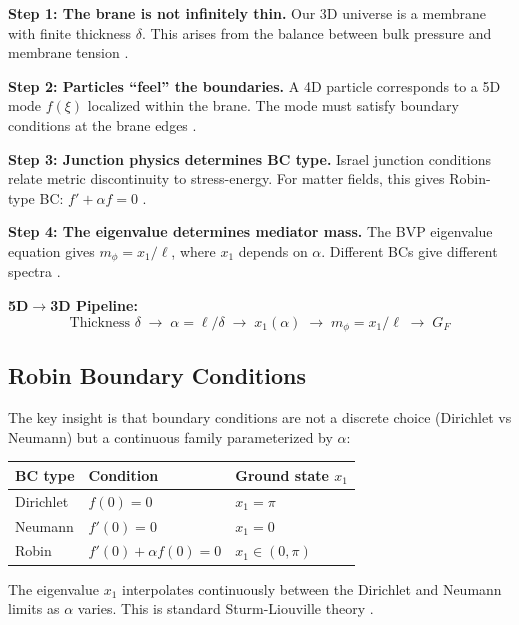 \begin{tcolorbox}[colback=green!5!white, colframe=green!50!black,
    title=\textbf{Physical Process: Membrane Thickness to Weak Scale}]

\textbf{Step 1: The brane is not infinitely thin.}
Our 3D universe is a membrane with finite thickness $\delta$. This arises from
the balance between bulk pressure and membrane tension \tagP{}.

\textbf{Step 2: Particles ``feel'' the boundaries.}
A 4D particle corresponds to a 5D mode $f(\xi)$ localized within the brane. The
mode must satisfy boundary conditions at the brane edges \tagDc{}.

\textbf{Step 3: Junction physics determines BC type.}
Israel junction conditions relate metric discontinuity to stress-energy. For
matter fields, this gives Robin-type BC: $f' + \alpha f = 0$ \tagDc{}.

\textbf{Step 4: The eigenvalue determines mediator mass.}
The BVP eigenvalue equation gives $m_\phi = x_1/\ell$, where $x_1$ depends
on $\alpha$. Different BCs give different spectra \tagDc{}.

\textbf{5D$\to$3D Pipeline:}
\[
\text{Thickness } \delta \;\to\; \alpha = \ell/\delta \;\to\;
x_1(\alpha) \;\to\; m_\phi = x_1/\ell \;\to\; G_F
\]
\end{tcolorbox}

\subsection{Robin Boundary Conditions}

The key insight is that boundary conditions are not a discrete choice (Dirichlet
vs Neumann) but a continuous family parameterized by $\alpha$:

\begin{center}
\begin{tabular}{lll}
\toprule
\textbf{BC type} & \textbf{Condition} & \textbf{Ground state $x_1$} \\
\midrule
Dirichlet & $f(0) = 0$ & $x_1 = \pi$ \\
Neumann & $f'(0) = 0$ & $x_1 = 0$ \\
Robin & $f'(0) + \alpha f(0) = 0$ & $x_1 \in (0, \pi)$ \\
\bottomrule
\end{tabular}
\end{center}

The eigenvalue $x_1$ interpolates continuously between the Dirichlet and Neumann
limits as $\alpha$ varies. This is standard Sturm-Liouville theory \tagM{}.

